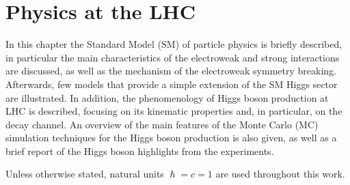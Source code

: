 \chapter{Physics at the LHC}\label{chap1}
\thispagestyle{empty}

In this chapter the Standard Model (SM) of particle physics is briefly described, in particular the main characteristics of the electroweak and strong interactions are discussed, as well as the mechanism of the electroweak symmetry breaking. Afterwards, few models that provide a simple extension of the SM Higgs sector are illustrated.
In addition, the phenomenology of Higgs boson production at LHC is described, focusing on its kinematic properties and, in particular, on the \hww decay channel. An overview of the main features of the Monte Carlo (MC) simulation techniques for the Higgs boson production is also given, as well as a brief report of the Higgs boson highlights from the experiments.

\noindent Unless otherwise stated, natural units $\hslash=c=1$ are used throughout this work.


%
%
%




